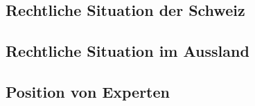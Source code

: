 	\subsection{Rechtliche Situation der Schweiz}
	\subsection{Rechtliche Situation im Aussland}
	\subsection{Position von Experten}
